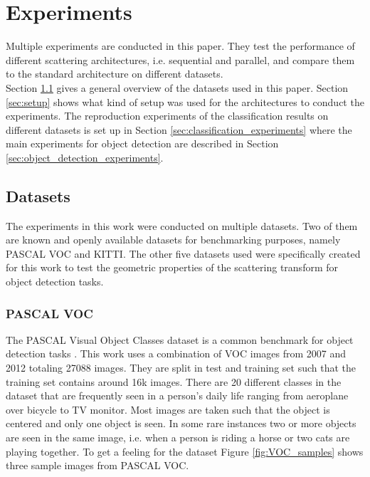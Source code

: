 \chapter{Experiments}
\label{chap:experiments}

Multiple experiments are conducted in this paper. They test the performance of different scattering architectures, i.e. sequential and parallel, and compare them to the standard architecture on different datasets. \\
Section \ref{sec:datasets} gives a general overview of the datasets used in this paper. Section \ref{sec:setup} shows what kind of setup was used for the architectures to conduct the experiments. The reproduction experiments of the classification results on different datasets is set up in Section \ref{sec:classification_experiments} where the main experiments for object detection are described in Section \ref{sec:object_detection_experiments}.

	
\section{Datasets}
\label{sec:datasets}

The experiments in this work were conducted on multiple datasets. Two of them are known and openly available datasets for benchmarking purposes, namely PASCAL VOC and KITTI. The other five datasets used were specifically created for this work to test the geometric properties of the scattering transform for object detection tasks. 

\subsection{PASCAL VOC}

The PASCAL Visual Object Classes dataset is a common benchmark for object detection tasks \cite{VOC}. This work uses a combination of VOC images from 2007 and 2012 totaling 27088 images. They are split in test and training set such that the training set contains around 16k images. There are 20 different classes in the dataset that are frequently seen in a person's daily life ranging from aeroplane over bicycle to TV monitor. Most images are taken such that the object is centered and only one object is seen. In some rare instances two or more objects are seen in the same image, i.e. when a person is riding a horse or two cats are playing together. To get a feeling for the dataset Figure \ref{fig:VOC_samples} shows three sample images from PASCAL VOC.

